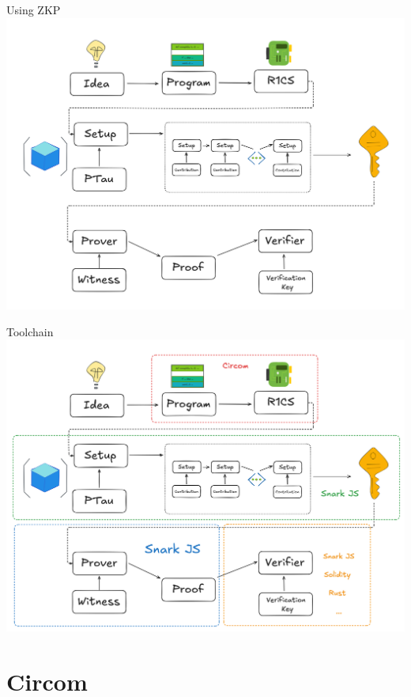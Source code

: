 \documentclass{zkdl-presentation-template}
\begin{document}
    \begin{frame}{Using ZKP}
        \includegraphics[width=\linewidth]{images/lecture_11/process_end}
    \end{frame}

    \begin{frame}{Toolchain}
        \includegraphics[width=\linewidth]{images/lecture_11/flow_end}
    \end{frame}

    \section{Circom}
\end{document}
